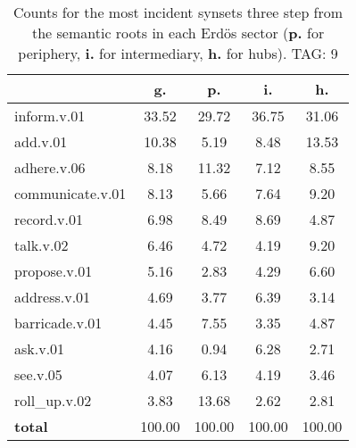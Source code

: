 \begin{table}[h!]
\begin{center}
\begin{tabular}{| l | c | c | c | c |}\hline
 & g. & p. & i. & h. \\\hline
inform.v.01 & 33.52  & 29.72  & 36.75  & 31.06 \\\hline
add.v.01 & 10.38  & 5.19  & 8.48  & 13.53 \\\hline
adhere.v.06 & 8.18  & 11.32  & 7.12  & 8.55 \\\hline
communicate.v.01 & 8.13  & 5.66  & 7.64  & 9.20 \\\hline
record.v.01 & 6.98  & 8.49  & 8.69  & 4.87 \\\hline
talk.v.02 & 6.46  & 4.72  & 4.19  & 9.20 \\\hline
propose.v.01 & 5.16  & 2.83  & 4.29  & 6.60 \\\hline
address.v.01 & 4.69  & 3.77  & 6.39  & 3.14 \\\hline
barricade.v.01 & 4.45  & 7.55  & 3.35  & 4.87 \\\hline
ask.v.01 & 4.16  & 0.94  & 6.28  & 2.71 \\\hline
see.v.05 & 4.07  & 6.13  & 4.19  & 3.46 \\\hline
roll\_up.v.02 & 3.83  & 13.68  & 2.62  & 2.81 \\\hline
{{\bf total}} & 100.00  & 100.00  & 100.00  & 100.00 \\\hline
\end{tabular}
\caption{Counts for the most incident synsets three step from the semantic roots in each Erd\"os sector ({\bf p.} for periphery, {\bf i.} for intermediary, {\bf h.} for hubs). TAG: 9}
\end{center}
\end{table}